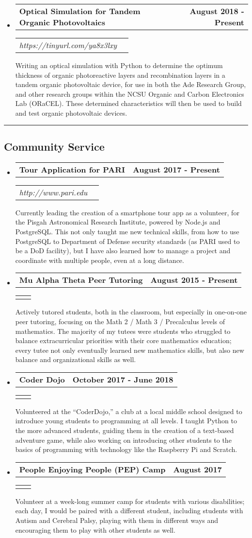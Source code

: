 \documentclass[10pt,letterpaper]{article}
\makeatletter
\newcommand{\headerrow}[2]
{\begin{tabular*}{\linewidth}{l@{\extracolsep{\fill}}r}
	#1 &
	#2 \\
\end{tabular*}}
\newcommand{\basicitem}[5]
{
	\item
	\headerrow
		{\textbf{#1}}
		{\textbf{#2}}
	\ifthenelse{\equal{#3}{} \AND \equal{#4}{}}
		{}
		{
			\headerrow
			{\emph{#3}}
			{\emph{#4}}
		}
	#5
}
\makeatother
\begin{document}
\begin{itemize}
	\basicitem
		{Optical Simulation for Tandem Organic Photovoltaics}
		{August 2018 - Present}
		{https://tinyurl.com/ya8x3lxy}
		{}
		{Writing an optical simulation with Python to determine the optimum thickness of organic photoreactive layers and recombination layers in a tandem organic photovoltaic device, for use in both the Ade Research Group, and other research groups within the NCSU Organic and Carbon Electronics Lab (ORaCEL). These determined characteristics will then be used to build and test organic photovoltaic devices.}

\end{itemize}

\hrule
\vspace{-0.4em}
\subsection*{Community Service}
\begin{itemize}
	\parskip=0.1em

	\basicitem
		{Tour Application for PARI}
		{August 2017 - Present}
		{http://www.pari.edu}
		{}
		{Currently leading the creation of a smartphone tour app as a volunteer, for the Pisgah Astronomical Research Institute, powered by Node.js and PostgreSQL. This not only taught me new technical skills, from how to use PostgreSQL to Department of Defense security standards (as PARI used to be a DoD facility), but I have also learned how to manage a project and coordinate with multiple people, even at a long distance.}

	\basicitem
		{Mu Alpha Theta Peer Tutoring}
		{August 2015 - Present}
		{}
		{}
		{Actively tutored students, both in the classroom, but especially in one-on-one peer tutoring, focusing on the Math 2 / Math 3 / Precalculus levels of mathematics. The majority of my tutees were students who struggled to balance extracurricular priorities with their core mathematics education; every tutee not only eventually learned new mathematics skills, but also new balance and organizational skills as well.}

	\basicitem
		{Coder Dojo}
		{October 2017 - June 2018}
		{}
		{}
		{Volunteered at the “CoderDojo,” a club at a local middle school designed to introduce young students to programming at all levels. I taught Python to the more advanced students, guiding them in the creation of a text-based adventure game, while also working on introducing other students to the basics of programming with technology like the Raspberry Pi and Scratch.}

	\basicitem
		{People Enjoying People (PEP) Camp}
		{August 2017}
		{}
		{}
		{Volunteer at a week-long summer camp for students with various disabilities; each day, I would be paired with a different student, including students with Autism and Cerebral Palsy, playing with them in different ways and encouraging them to play with other students as well.}
	
\end{itemize}
\end{document}
